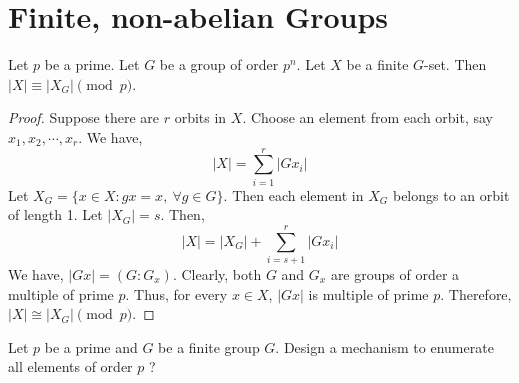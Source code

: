\section{Finite, non-abelian Groups}
\begin{theorem}
	Let $p$ be a prime. Let $G$ be a group of order $p^n$.
	Let $X$ be a finite $G$-set.
	Then $|X| \equiv |X_G| \pmod{p}$.
\end{theorem}
\begin{proof}
	Suppose there are $r$ orbits in $X$.
	Choose an element from each orbit, say $x_1,x_2,\cdots,x_r$.
	We have, 
	\begin{equation}
		|X| = \sum_{i = 1}^r |Gx_i|
	\end{equation}
	Let $X_G = \{ x \in X : gx = x,\ \forall g \in G \}$.
	Then each element in $X_G$ belongs to an orbit of length 1.
	Let $|X_G| = s$. Then,
	\begin{equation}
		|X| = |X_G| + \sum_{i = s+1}^r |Gx_i|
	\end{equation}
	We have, $|Gx| = (G:G_x)$.
	Clearly, both $G$ and $G_x$ are groups of order a multiple of prime $p$.
	Thus, for every $x \in X$, $|Gx|$ is multiple of prime $p$.
	Therefore, $|X| \cong |X_G| \pmod{p}$.
\end{proof}

\begin{challenge}
	Let $p$ be a prime and $G$ be a finite group $G$.
	Design a mechanism to enumerate all elements of order $p$ ?
\end{challenge}

